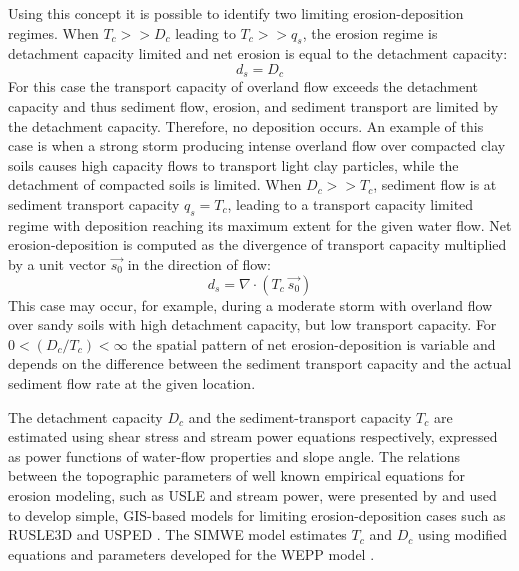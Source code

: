 \documentclass[gmd, manuscript]{copernicus}
\begin{document}
Using this concept it is possible to identify 
two limiting erosion-deposition regimes.
When $T_c >> D_c$ leading to $T_c >> q_s$, 
the erosion regime is detachment capacity limited and
net erosion is equal to the detachment capacity:
\begin{equation}
\label{eq:detachment_limited}
 d_s = D_c
\end{equation}
For this case the transport capacity of overland flow 
exceeds the detachment capacity 
and thus sediment flow, erosion, and sediment transport
are limited by the detachment capacity. 
Therefore, no deposition occurs.
An example of this case is when a strong storm 
producing intense %
overland flow over compacted clay soils 
causes high capacity flows to transport light clay particles,
while the detachment of compacted soils is limited.
%
When $D_c >> T_c$, sediment flow is at sediment transport capacity $q_s = T_c$, 
leading to a transport capacity limited regime 
with deposition reaching its maximum extent for the given water flow. 
Net erosion-deposition is computed as the divergence of
transport capacity multiplied by a unit vector $\vec{s_0}$ 
in the direction of flow:
\begin{equation}
\label{eq:transport_limited}
 d_s = \nabla\cdot (T_c ~ \vec{s_0})
\end{equation}
This case may occur, for example, during a moderate storm 
with overland flow over sandy soils 
with high detachment capacity, but low transport capacity.
%
For $0 < ({D_c / T_c}) < \infty$ 
the spatial pattern of net erosion-deposition is variable 
and depends on the difference between the sediment transport capacity 
and the actual sediment flow rate at the given location.

The detachment capacity $D_c $  and the sediment-transport capacity $T_c $  
are estimated using shear stress and stream power equations respectively,
expressed as power functions of water-flow properties and slope angle.    
The relations between the topographic parameters 
of well known empirical equations for erosion modeling, 
such as USLE and stream power, were presented by \cite{Moore1986} 
and used to develop simple, GIS-based models for limiting erosion-deposition cases 
such as RUSLE3D and USPED \citep{Mitasova2001}.
The SIMWE model estimates $T_c$ and $D_c$ using modified 
equations and parameters developed for the WEPP model 
\citep{Flanagan2013,Mitasova2013}.
\end{document}
